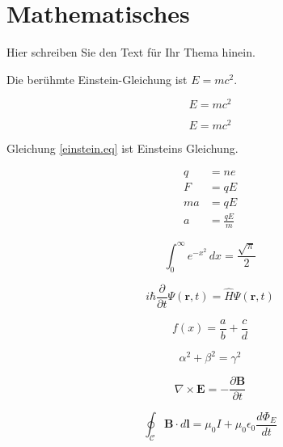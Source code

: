 \section{Mathematisches}

Hier schreiben Sie den Text für Ihr Thema hinein.

Die berühmte Einstein-Gleichung ist $E = mc^2$.

\[
E = mc^2 
\]

\begin{equation}
E = mc^2
\label{einstein.eq}
\end{equation}

Gleichung \ref{einstein.eq} ist Einsteins Gleichung.

\begin{align}
q &= ne \\
F &= qE \\
ma &= qE \\
a &= \frac{qE}{m}
\end{align}

\begin{equation}
\int_0^\infty e^{-x^2} \, dx = \frac{\sqrt{\pi}}{2}
\end{equation}

\[
i\hbar \frac{\partial}{\partial t} \Psi(\mathbf{r}, t) = \hat{H} \Psi(\mathbf{r}, t)
\]

\begin{equation}
f(x) = \frac{a}{b} + \frac{c}{d}
\label{eq2}
\end{equation}

\begin{equation}
\alpha^2 + \beta^2 = \gamma^2
\label{eq1}
\end{equation}

\begin{equation}
\nabla \times \mathbf{E} = -\frac{\partial \mathbf{B}}{\partial t}
\label{maxwell1}
\end{equation}

\begin{equation}
\oint_\mathcal{C} \mathbf{B} \cdot d\mathbf{l} = \mu_0 I + \mu_0 \epsilon_0 \frac{d\Phi_E}{dt}
\label{maxwell2}
\end{equation}

